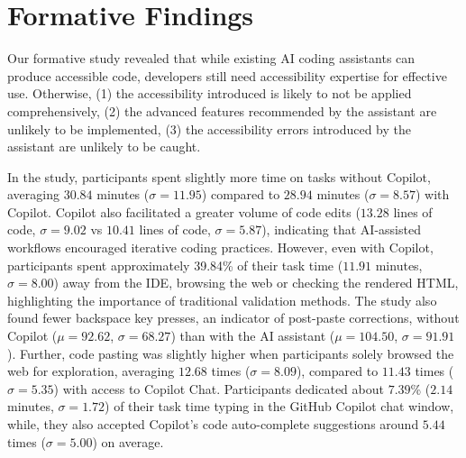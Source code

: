 \section{Formative Findings}
\label{form_finds}
Our formative study revealed that while existing AI coding assistants can produce accessible code, developers still need accessibility expertise for effective use. Otherwise, 
(1) the accessibility introduced is likely to not be applied comprehensively, (2) the advanced features recommended by the assistant are unlikely to be implemented,  (3) the accessibility errors introduced by the assistant are unlikely to be caught.

In the study, participants spent slightly more time on tasks without Copilot, averaging $30.84$ minutes ($\sigma = 11.95$) compared to $28.94$ minutes ($\sigma = 8.57$) with Copilot. Copilot also facilitated a greater volume of code edits ($13.28$ lines of code, $\sigma = 9.02$ vs $10.41$ lines of code, $\sigma = 5.87$), indicating that AI-assisted workflows encouraged iterative coding practices. However, even with Copilot, participants spent approximately 39.84\% of their task time ($11.91$ minutes, $\sigma = 8.00$) away from the IDE, browsing the web or checking the rendered HTML, highlighting the importance of traditional validation methods. The study also found fewer backspace key presses, an indicator of post-paste corrections, without Copilot ($\mu = 92.62$, $\sigma = 68.27$) than with the AI assistant ($\mu = 104.50$, $\sigma = 91.91$). Further, code pasting was slightly higher when participants solely browsed the web for exploration, averaging $12.68$ times ($\sigma = 8.09$), compared to $11.43$ times ($\sigma = 5.35$) with access to Copilot Chat. Participants dedicated about $7.39$\% ($2.14$ minutes, $\sigma = 1.72$) of their task time typing in the GitHub Copilot chat window, while, they also accepted Copilot's code auto-complete suggestions around $5.44$ times ($\sigma = 5.00$) on average.


